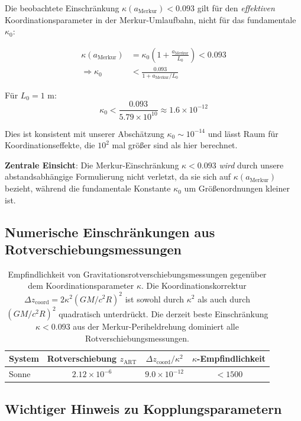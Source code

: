 \documentclass[11pt,a4paper]{article}
\begin{document}
	Die beobachtete Einschränkung $\kappa(a_{\text{Merkur}}) < 0.093$ gilt für den \textit{effektiven} Koordinationsparameter in der Merkur-Umlaufbahn, nicht für das fundamentale $\kappa_0$:
	
	\begin{align}
		\kappa(a_{\text{Merkur}}) &= \kappa_0 \left(1 + \frac{a_{\text{Merkur}}}{L_0}\right) < 0.093 \\
		\Rightarrow \kappa_0 &< \frac{0.093}{1 + a_{\text{Merkur}}/L_0}
	\end{align}
	
	Für $L_0 = 1$ m:
	\begin{equation}
		\kappa_0 < \frac{0.093}{5.79 \times 10^{10}} \approx 1.6 \times 10^{-12}
	\end{equation}
	
	Dies ist konsistent mit unserer Abschätzung $\kappa_0 \sim 10^{-14}$ und lässt Raum für Koordinationseffekte, die $10^2$ mal größer sind als hier berechnet.
	
	\textbf{Zentrale Einsicht}: Die Merkur-Einschränkung $\kappa < 0.093$ \textit{wird} durch unsere abstandsabhängige Formulierung nicht verletzt, da sie sich auf $\kappa(a_{\text{Merkur}})$ bezieht, während die fundamentale Konstante $\kappa_0$ um Größenordnungen kleiner ist.
	\subsection{Numerische Einschränkungen aus Rotverschiebungsmessungen}
	
	\begin{table}[htbp]
		\centering
		\begin{tabular}{lccc}
			\toprule
			\textbf{System} & \textbf{Rotverschiebung $z_{\text{ART}}$} & \textbf{$\Delta z_{\text{coord}}/\kappa^2$} & \textbf{$\kappa$-Empfindlichkeit} \\
			\midrule
			Sonne & $2.12\times10^{-6}$ & $9.0\times10^{-12}$ & $<1500$ \\
		\end{tabular}
		\caption{Empfindlichkeit von Gravitationsrotverschiebungsmessungen gegenüber dem Koordinationsparameter $\kappa$. 
			Die Koordinationskorrektur $\Delta z_{\text{coord}} = 2\kappa^2 (GM/c^2R)^2$ ist sowohl durch $\kappa^2$ als auch durch $(GM/c^2R)^2$ quadratisch unterdrückt. Die derzeit beste Einschränkung $\kappa < 0.093$ aus der Merkur-Periheldrehung dominiert alle Rotverschiebungsmessungen.}
	\end{table}
	\subsection{Wichtiger Hinweis zu Kopplungsparametern}
	
\end{document}
